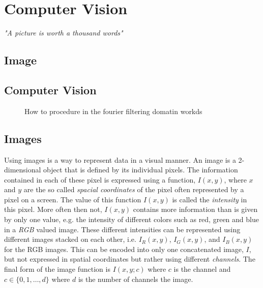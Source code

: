 \chapter{Computer Vision}
\begin{center}
\vspace{-6ex}
\textit{"A picture is worth a thousand words"}
\vspace{6ex}
\end{center}


 \section{Image}

\section{Computer Vision}


 \begin{figure}
\centering

\caption{\label{fig:FourierFilter} How to procedure in the fourier filtering domatin workds}
\end{figure}




\section{Images}

Using images is a way to represent data in a visual manner. An image is a 2-dimensional object that is defined by its individual pixels. The information contained in each of these pixel is expressed using a function, $I(x,y)$, where $x$ and $y$ are the so called \textit{spacial coordinates} of the pixel often represented by a pixel on a screen. The value of this function $I(x,y)$ is called the \textit{intensity} in this pixel. More often then not, $I(x,y)$ contains more information than is given by only one value, e.g. the intensity of different colors such as red, green and blue in a \textit{RGB} valued image. These different intensities can be represented using different images stacked on each other, i.e. $I_R(x,y)$, $I_G(x,y)$, and $I_B(x,y)$ for the RGB images. This can be encoded into only one concatenated image, $I$, but not expressed in spatial coordinates but rather using different \textit{channels}. The final form of the image function is $I(x,y;c)$ where $c$ is the channel and $c\in\{0,1,\ldots, d\}$ where $d$ is the number of channels the image.

